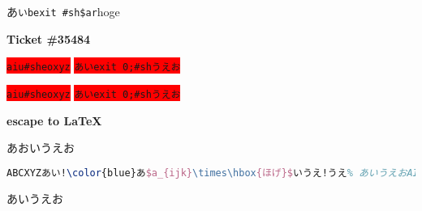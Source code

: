 \documentclass{jarticle}
\begin{document}
あ\lstinline[basicstyle=\tt]{いbexit #sh$ar}hoge

\bigskip
\textbf{Ticket \#35484}

\colorbox{red}{\lstinline!aiu#sheoxyz!}
\colorbox{red}{\lstinline!あいexit 0;#shうえお!}


\colorbox{red}{\lstinline{aiu#sheoxyz}}
\colorbox{red}{\lstinline{あいexit 0;#shうえお}}

\bigskip
\textbf{escape to \LaTeX}

あおいうえお
\begin{lstlisting}[commentstyle=\color{green}\bfseries,
  frame=single,language=TeX, escapechar=!]
ABCXYZあい!\color{blue}あ$a_{ijk}\times\hbox{ほげ}$いうえ!うえ% あいうえおAIg
\end{lstlisting}
あいうえお
\end{document}
